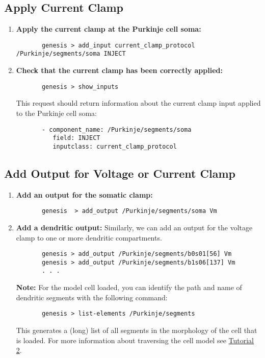 \documentclass[12pt]{article}
\begin{document}
\subsection*{Apply Current Clamp}

\begin{enumerate}	
	\item{\bf Apply the current clamp at the Purkinje cell soma:}
	\begin{verbatim}
	   genesis > add_input current_clamp_protocol /Purkinje/segments/soma INJECT
	\end{verbatim}
	
	\item{\bf Check that the current clamp has been correctly applied:}
	\begin{verbatim}
	   genesis > show_inputs
	\end{verbatim}
	This request should return information about the current clamp input applied to the Purkinje cell soma:
	\begin{verbatim}
	   - component_name: /Purkinje/segments/soma
	      field: INJECT
	      inputclass: current_clamp_protocol
	   \end{verbatim}
\end{enumerate}

\subsection*{Add Output for Voltage or Current Clamp}

\begin{enumerate}
	\item{\bf Add an output for the somatic clamp:}
	\begin{verbatim}
	   genesis  > add_output /Purkinje/segments/soma Vm
	\end{verbatim}
	
	\item{\bf Add a dendritic output:} Similarly, we can add an output for the voltage clamp to one or more dendritic compartments.
	\begin{verbatim}
	   genesis > add_output /Purkinje/segments/b0s01[56] Vm
	   genesis > add_output /Purkinje/segments/b1s06[137] Vm
	   . . .
	\end{verbatim}
	{\bf Note:} For the model cell loaded, you can identify the path and name of dendritic segments with the following command:
	\begin{verbatim}
	   genesis > list-elements /Purkinje/segments
	\end{verbatim}	
	This generates a (long) list of all segments in the morphology of the cell that is loaded. For more information about traversing the cell model see \href{../tutorial2/tutorial2.tex}{Tutorial 2}.
\end{enumerate}
\end{document}
